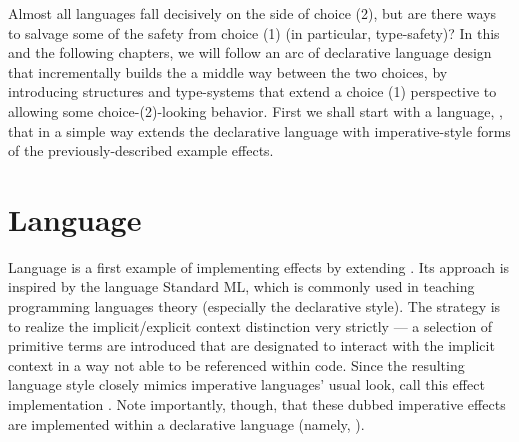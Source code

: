 Almost all languages fall decisively on the side of choice (2), but are there ways to salvage some of the safety from choice (1) (in particular, type-safety)?
In this and the following chapters, we will follow an arc of declarative language design that incrementally builds the a middle way between the two choices, by introducing structures and type-systems that extend a choice (1) perspective to allowing some choice-(2)-looking behavior.
First we shall start with a language, \LangB, that in a simple way extends the declarative language \LangA with imperative-style forms of the previously-described example effects.


\section{Language \LangB}

Language \LangB is a first example of implementing effects by extending \LangA.
Its approach is inspired by the language Standard ML, which is commonly used in teaching programming languages theory (especially the declarative style).
The strategy is to realize the {implicit/explicit} context distinction very strictly --- a selection of primitive terms are introduced that are designated to interact with the implicit context in a way not able to be referenced within \LangB code.
Since the resulting language style closely mimics imperative languages' usual look, call this effect implementation .
Note importantly, though, that these dubbed imperative effects are implemented within a declarative language (namely, \LangB).

